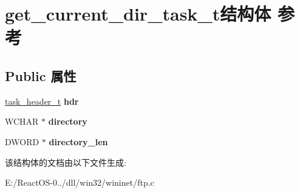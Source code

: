 \hypertarget{structget__current__dir__task__t}{}\section{get\+\_\+current\+\_\+dir\+\_\+task\+\_\+t结构体 参考}
\label{structget__current__dir__task__t}
\subsection*{Public 属性}
\begin{DoxyCompactItemize}
\item 
\mbox{\label{structget__current__dir__task__t_a64a2c7bbfe1525d5d5ebc38bbef91d75}} 
\hyperlink{structtask__header__t}{task\+\_\+header\+\_\+t} {\bfseries hdr}
\item 
\mbox{\label{structget__current__dir__task__t_ac5bcfd9300ab7d30ab18fc557ea9b781}} 
W\+C\+H\+AR $\ast$ {\bfseries directory}
\item 
\mbox{\label{structget__current__dir__task__t_a5e745bf8b4981c9cbf4dd124078400e9}} 
D\+W\+O\+RD $\ast$ {\bfseries directory\+\_\+len}
\end{DoxyCompactItemize}


该结构体的文档由以下文件生成\+:\begin{DoxyCompactItemize}
\item 
E\+:/\+React\+O\+S-\/0../dll/win32/wininet/ftp.\+c\end{DoxyCompactItemize}
